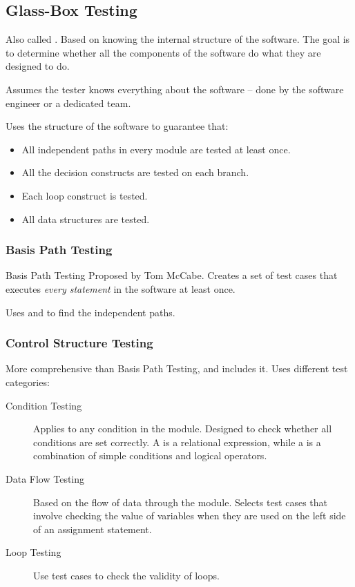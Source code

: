 \documentclass[\main/notes.tex]{subfiles}
\begin{document}
			\subsection{Glass-Box Testing}
				Also called . Based on knowing the internal structure of the software. The goal is to determine whether all the components of the software do what they are designed to do.

				Assumes the tester knows everything about the software -- done by the software engineer or a dedicated team.

				Uses the structure of the software to guarantee that:
				\begin{itemize}[nosep]
					\item All independent paths in every module are tested at least once.
					\item All the decision constructs are tested on each branch.
					\item Each loop construct is tested.
					\item All data structures are tested.
				\end{itemize}
				\subsubsection{Basis Path Testing}
					\begin{definition}{Basis Path Testing}
							Proposed by Tom McCabe. Creates a set of test cases that executes \emph{every statement} in the software at least once.

							Uses  and  to find the independent paths.
					\end{definition}
				\subsubsection{Control Structure Testing}
					More comprehensive than Basis Path Testing, and includes it. Uses different test categories:
					\begin{indentparagraph}
						\begin{description}
							\item[Condition Testing] Applies to any condition in the module. Designed to check whether all conditions are set correctly. A  is a relational expression, while a  is a combination of simple conditions and logical operators.
							\item[Data Flow Testing] Based on the flow of data through the module. Selects test cases that involve checking the value of variables when they are used on the left side of an assignment statement.
							\item[Loop Testing] Use test cases to check the validity of loops.
						\end{description}
					\end{indentparagraph}
\end{document}
